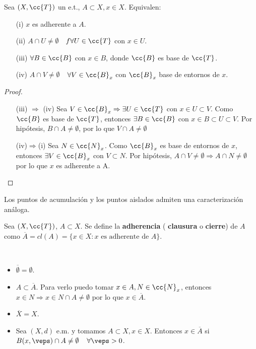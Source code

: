 \begin{prop}
    Sea $(X, \cc{T})$ un e.t., $A\subset X, x \in X$. Equivalen:
    \begin{enumerate}
        \item[(i)] $x$ es adherente a $A$.
        \item[(ii)] $A\cap U \neq \emptyset$\ \ $f\forall U \in \cc{T}$ con $x\in U$.
        \item[(iii)] $\forall B \in \cc{B}$ con $x\in B$, donde $\cc{B}$ es base de $\cc{T}$.
        \item[(iv)] $A\cap V \neq \emptyset$\ \ $\forall V \in \cc{B}_x$ con $\cc{B}_x$ base de entornos de $x$.  
    \end{enumerate}

    \begin{proof}\
        \begin{itemize}
            \item[(iii) $\Rightarrow$ (iv)] Sea $V\in \cc{B}_x\Rightarrow \exists U \in \cc{T}$ con $x\in U \subset V$. Como $\cc{B}$ es base de $\cc{T}$, entonces $\exists B\in \cc{B}$ con $x\in B\subset U \subset V$. Por hipótesis, $B\cap A \neq \emptyset$, por lo que $V\cap A \neq \emptyset$
            \item[(iv)$\Rightarrow$(i)] Sea $N \in \cc{N}_x$. Como $\cc{B}_x$ es base de entornos de $x$, entonces $\exists V \in \cc{B}_x$ con $V\subset N$. Por hipótesis, $A\cap V\neq \emptyset \Rightarrow A\cap N \neq \emptyset$ por lo que $x$ es adherente a A.
        \end{itemize}
    \end{proof}
\end{prop}

\begin{observacion}
    Los puntos de acumulación y los puntos aislados admiten una caracterización análoga. %
    \endsquare
\end{observacion}

\begin{definicion}
    Sea $(X, \cc{T})$, $A\subset X$. Se define la \textbf{adherencia} ( \textbf{clausura} o \textbf{cierre}) de $A$ como $\overline{A}=cl(A)=\{x\in X : x \text{ es adherente de } A\}$.
    \endsquare
\end{definicion}

\begin{ejemplo}\
    \begin{itemize}
        \item $\overline{\emptyset} = \emptyset$.
        \item $A\subset \overline{A}$. Para verlo puedo tomar $x\in A, N  \in \cc{N}_x$, entonces $x\in N\Rightarrow x \in N\cap A \neq \emptyset$ por lo que $x\in \overline{A}$.
        \item $\overline{X} = X$.
        \item Sea $(X,d)$ e.m. y tomamos $A\subset X, x \in X$. Entonces $x\in \overline{A}$ si $B(x,\veps)\cap A \neq \emptyset$\ \ $\forall \veps >0$.
    \end{itemize}
    \endsquare
\end{ejemplo}

